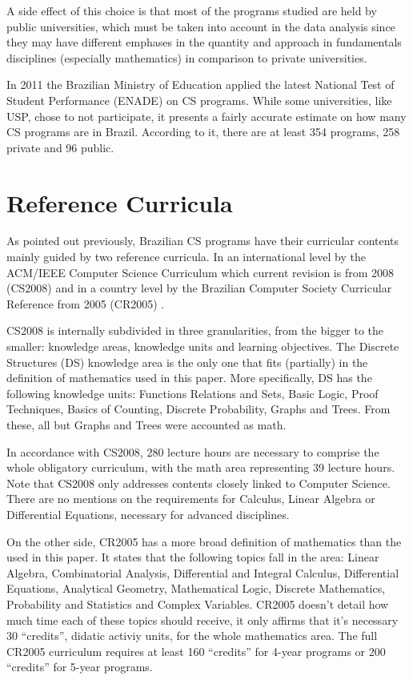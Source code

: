 \documentclass[conference]{IEEEtran}
\begin{document}
	A side effect of this choice is that most of the programs studied are held by public universities, which must be taken into account in the data analysis since they may have different emphases in the quantity and approach in fundamentals disciplines (especially mathematics) in comparison to private universities.
	
	In 2011 the Brazilian Ministry of Education applied the latest National Test of Student Performance (ENADE) on CS programs. While some universities, like USP, chose to not participate, it presents a fairly accurate estimate on how many CS programs are in Brazil. According to it, there are at least 354 programs, 258 private and 96 public. \cite{enade} 

\section{Reference Curricula}
	As pointed out previously, Brazilian CS programs have their curricular contents mainly guided by two reference curricula. In an international level by the ACM/IEEE Computer Science Curriculum which current revision is from 2008 (CS2008) \cite{cs2008} and in a country level by the Brazilian Computer Society Curricular Reference from 2005 (CR2005) \cite{sbc}.

	CS2008 is internally subdivided in three granularities, from the bigger to the smaller: knowledge areas, knowledge units and learning objectives. The Discrete Structures (DS) knowledge area is the only one that fits (partially) in the definition of mathematics used in this paper. More specifically, DS has the following knowledge units: Functions Relations and Sets, Basic Logic, Proof Techniques, Basics of Counting, Discrete Probability, Graphs and Trees. From these, all but Graphs and Trees were accounted as math.

	In accordance with CS2008, 280 lecture hours are necessary to comprise the whole obligatory curriculum, with the math area representing 39 lecture hours. \cite{cs2008} Note that CS2008 only addresses contents closely linked to Computer Science. There are no mentions on the requirements for Calculus, Linear Algebra or Differential Equations, necessary for advanced disciplines.

	On the other side, CR2005 has a more broad definition of mathematics than the used in this paper. It states that the following topics fall in the area: Linear Algebra, Combinatorial Analysis, Differential and Integral Calculus, Differential Equations, Analytical Geometry, Mathematical Logic, Discrete Mathematics, Probability and Statistics and Complex Variables. CR2005 doesn't detail how much time each of these topics should receive, it only affirms that it's necessary 30 ``credits'', didatic activiy units, for the whole mathematics area. The full CR2005 curriculum requires at least 160 ``credits'' for 4-year programs or 200 ``credits'' for 5-year programs.
\end{document}
